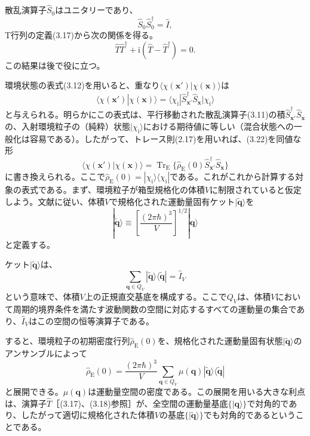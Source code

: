 散乱演算子$\hat S_0$はユニタリーであり、
\begin{equation}\hat S_0\hat S_0^{\dagger}=\hat I,\tag{3.20}\end{equation}
T行列の定義(3.17)から次の関係を得る。
\begin{equation}\hat T\hat T^{\dagger}+\mathrm i(\hat T-\hat T^{\dagger})=0.\tag{3.21}\end{equation}
この結果は後で役に立つ。

環境状態の表式(3.12)を用いると、重なり$\langle\chi(\bm x')|\chi(\bm x)\rangle$は
\begin{equation}
\langle\chi(\bm x')|\chi(\bm x)\rangle=\langle\chi_{\mathrm i}|\hat S_{\bm x'}^{\dagger}\hat S_{\bm x}|\chi_{\mathrm i}\rangle
\tag{3.22}
\end{equation}
と与えられる。明らかにこの表式は、平行移動された散乱演算子(3.11)の積$\hat S_{\bm x'}^{\dagger}\hat S_{\bm x}$の、入射環境粒子の（純粋）状態$|\chi_{\mathrm i}\rangle$における期待値に等しい（混合状態への一般化は容易である）。したがって、トレース則(2.17)を用いれば、(3.22)を同値な形
\begin{equation}
\langle\chi(\bm x')|\chi(\bm x)\rangle=\operatorname{Tr}_{\mathrm E}\{\hat\rho_{\mathrm E}(0)\hat S_{\bm x'}^{\dagger}\hat S_{\bm x}\}
\tag{3.23}
\end{equation}
に書き換えられる。ここで$\hat\rho_{\mathrm E}(0)=|\chi_{\mathrm i}\rangle\langle\chi_{\mathrm i}|$である。これがこれから計算する対象の表式である。まず、環境粒子が箱型規格化の体積$V$に制限されていると仮定しよう。文献\cite{ref160}に従い、体積$V$で規格化された運動量固有ケット$|\widetilde{\bm q}\rangle$を
\begin{equation}
|\widetilde{\bm q}\rangle\equiv\left[\frac{(2\pi\hbar)^3}{V}\right]^{1/2}|\bm q\rangle
\tag{3.24}
\end{equation}
と定義する。

\hypertarget{srcpage:124}{}\label{srcpage:124}
ケット$|\widetilde{\bm q}\rangle$は、
\begin{equation}
\sum_{\bm q\in Q_V}|\widetilde{\bm q}\rangle\langle\widetilde{\bm q}|=\hat I_V
\tag{3.25}
\end{equation}
という意味で、体積$V$上の正規直交基底を構成する。ここで$Q_V$は、体積$V$において周期的境界条件を満たす波動関数の空間に対応するすべての運動量の集合であり、$\hat I_V$はこの空間の恒等演算子である。

すると、環境粒子の初期密度行列$\hat\rho_{\mathrm E}(0)$を、規格化された運動量固有状態$|\widetilde{\bm q}\rangle$のアンサンブルによって
\begin{equation}
\hat\rho_{\mathrm E}(0)=\frac{(2\pi\hbar)^3}{V}\sum_{\bm q\in Q_V}\mu(\bm q)|\widetilde{\bm q}\rangle\langle\widetilde{\bm q}|
\tag{3.26}
\end{equation}
と展開できる。$\mu(\bm q)$は運動量空間の密度である。この展開を用いる大きな利点は、演算子$\hat T$［(3.17)、(3.18)参照］が、全空間の運動量基底$\{|\bm q\rangle\}$で対角的であり、したがって適切に規格化された体積$V$の基底$\{|\widetilde{\bm q}\rangle\}$でも対角的であるということである。

